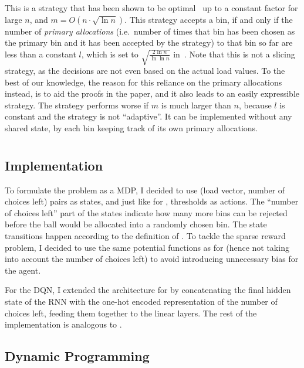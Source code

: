 This is a strategy that has been shown to be optimal~\cite{feldheim2021thinning} up to a constant factor for large $n$, and $m = O(n \cdot \sqrt{\ln n})$. This strategy accepts a bin, if and only if the number of \textit{primary allocations} (i.e.\ number of times that bin has been chosen as the primary bin and it has been accepted by the strategy) to that bin so far are less than a constant $l$, which is set to $\sqrt{\frac{2\ln n}{\ln \ln n}}$ in~\cite{feldheim2021thinning}. Note that this is not a slicing strategy, as the decisions are not even based on the actual load values. To the best of our knowledge, the reason for this reliance on the primary allocations instead, is to aid the proofs in the paper, and it also leads to an easily expressible strategy. The strategy performs worse if $m$ is much larger than $n$, because $l$ is constant and the strategy is not ``adaptive''. It can be implemented without any shared state, by each bin keeping track of its own primary allocations.

\section{\KThinning}


\subsection{\DQL Implementation}


To formulate the \KThinning problem as a MDP, I decided to use (load vector, number of choices left) pairs as states, and just like for \TwoThinning, thresholds as actions. The ``number of choices left'' part of the states indicate how many more bins can be rejected before the ball would be allocated into a randomly chosen bin. The state transitions happen according to the definition of \KThinning. To tackle the sparse reward problem, I decided to use the same potential functions as for \TwoThinning (hence not taking into account the number of choices left) to avoid introducing unnecessary bias for the agent.


For the DQN, I extended the architecture for \TwoThinning by concatenating the final hidden state of the RNN with the one-hot encoded representation of the number of choices left, feeding them together to the linear layers. The rest of the implementation is analogous to \TwoThinning.



\subsection{Dynamic Programming}


